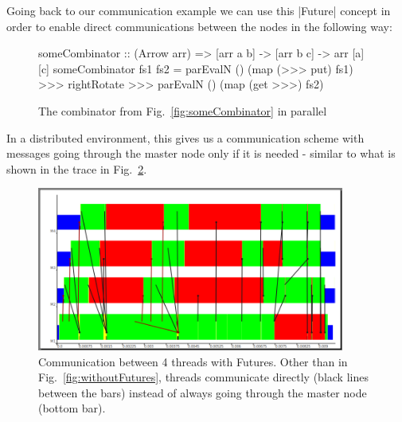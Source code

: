 Going back to our communication example we can use this |Future| concept in order to enable direct communications between the nodes in the following way:
\begin{figure}[h]
\begin{code}
someCombinator :: (Arrow arr) => [arr a b] -> [arr b c] -> arr [a] [c]
someCombinator fs1 fs2 =
	parEvalN () (map (>>> put) fs1) >>>
	rightRotate >>>
	parEvalN () (map (get >>>) fs2)
\end{code}
\caption{The combinator from Fig.~\ref{fig:someCombinator} in parallel}
\label{fig:someCombinatorParallel}
\end{figure}
In a distributed environment, this gives us a communication scheme with messages going through the master node only if it is needed - similar to what is shown in the trace in Fig.~\ref{fig:withFutures}.
\begin{figure}[ht]
	\centering
	\includegraphics[width=0.9\textwidth]{images/withFutures}
	\caption[with Futures]{Communication between 4 threads with Futures. Other than in Fig.~\ref{fig:withoutFutures}, threads communicate directly (black lines between the bars) instead of always going through the master node (bottom bar).}
	\label{fig:withFutures}
\end{figure}